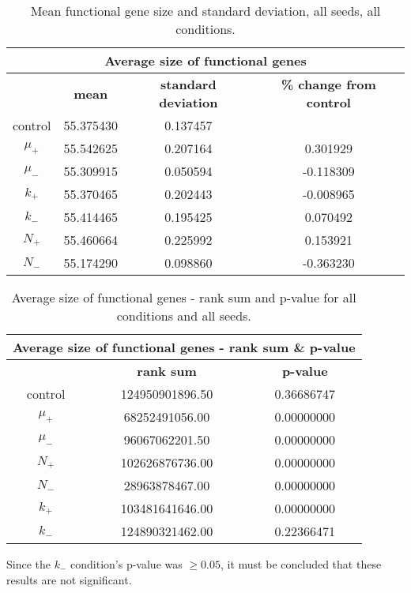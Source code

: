 \begin{table}[H]
	\centering
	\begin{tabular}{|c|c|c|c|}
		\hline
		\multicolumn{4}{c}{\Large \textbf{Average size of functional genes}} \\
		\hline
		& \textbf{mean} & \textbf{standard deviation} & \textbf{\% change from control} \\
		\hline
		control & 55.375430 & 0.137457 & \textemdash \\ 
		\hline
		$\mu_+$ & 55.542625 & 0.207164 & 0.301929 \\ 
		\hline
		$\mu_-$ & 55.309915 & 0.050594 & -0.118309 \\ 
		\hline
		$k_+$ & 55.370465 & 0.202443 & -0.008965 \\ 
		\hline
		$k_-$ & 55.414465 & 0.195425 & 0.070492 \\ 
		\hline
		$N_+$ & 55.460664 & 0.225992 & 0.153921 \\ 
		\hline
		$N_-$ & 55.174290 & 0.098860 & -0.363230 \\ 
		\hline
	\end{tabular}
	\caption[Mean functional gene size and standard deviation]{Mean functional gene size and standard deviation, all seeds, all conditions.}
	\label{table:mean_functional_gene_size_and_std_dev}
\end{table}

\begin{table}[H]
	\begin{tabular}{|c|c|c|}
		\hline
		\multicolumn{3}{c}{\Large \textbf{Average size of functional genes - rank sum \& p-value}} \\
		\hline
		& \textbf{rank sum} & \textbf{p-value} \\
		\hline
		control & 124950901896.50 & 0.36686747 \\ 
		\hline
		$\mu_+$ & 68252491056.00 & 0.00000000 \\ 
		\hline
		$\mu_-$ & 96067062201.50 & 0.00000000 \\ 
		\hline
		$N_+$ & 102626876736.00 & 0.00000000 \\ 
		\hline
		$N_-$ & 28963878467.00 & 0.00000000 \\ 
		\hline
		$k_+$ & 103481641646.00 & 0.00000000 \\ 
		\hline
		$k_-$ & 124890321462.00 & 0.22366471 \\ 
		\hline
	\end{tabular}
	\caption[Average size of functional genes - rank sum and p-value]{Average size of functional genes - rank sum and p-value for all conditions and all seeds.}
	\label{table:avg_size_of_functional_genes_rank_sum_and_p-value}
\end{table}
Since the $k_-$ condition's p-value was $\geq0.05$, it must be concluded that these results are not significant. 

